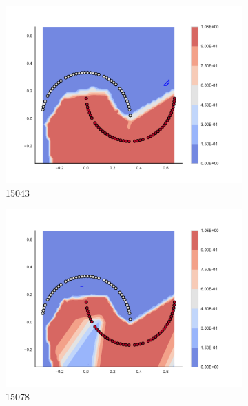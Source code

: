 \begin{figure}[h]
\begin{subfigure}[b]{0.09\textwidth}
    \includegraphics[clip, trim=2.35cm 1.75cm 4.5cm 0cm,width=\textwidth]{img/convergence/15043.pdf}
    \caption{15043}
    \label{fig:convergence_15043}
\end{subfigure}
%
\begin{subfigure}[b]{0.09\textwidth}
    \includegraphics[clip, trim=2.35cm 1.75cm 4.5cm 0cm,width=\textwidth]{img/convergence/15078.pdf}
    \caption{15078}
    \label{fig:convergence_15078}
\end{subfigure}
%
\begin{subfigure}[b]{0.09\textwidth}

\end{subfigure}
\end{figure}
